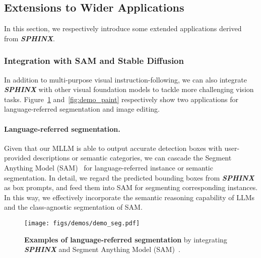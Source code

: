 \documentclass{article} \usepackage{iclr2024_conference,times}
\begin{document}
\subsection{Extensions to Wider Applications}
\label{s3.3}
In this section, we respectively introduce some extended applications derived from \textcolor{Goldenrod3}{\textbf{\textit{SPHINX}}}.

\subsubsection{Integration with SAM and Stable Diffusion}

In addition to multi-purpose visual instruction-following, we can also integrate \textcolor{Goldenrod3}{\textbf{\textit{SPHINX}}} with other visual foundation models to tackle more challenging vision tasks. Figure~\ref{fig:demo_seg} and~\ref{fig:demo_paint} respectively show two applications for language-referred segmentation and image editing. 

\paragraph{Language-referred segmentation.}
Given that our MLLM is able to output accurate detection boxes with user-provided descriptions or semantic categories, we can cascade the Segment Anything Model (SAM)~\citep{kirillov2023segment} for language-referred instance or semantic segmentation. In detail, we regard the predicted bounding boxes from \textcolor{Goldenrod3}{\textbf{\textit{SPHINX}}} as box prompts, and feed them into SAM for segmenting corresponding instances. In this way, we effectively incorporate the semantic reasoning capability of LLMs and the class-agnostic segmentation of SAM. 

\begin{figure}[t]
    \centering
\texttt{[image: figs/demos/demo\_seg.pdf]}
    \caption{\textbf{Examples of language-referred segmentation} by integrating \textcolor{Goldenrod3}{\textbf{\textit{SPHINX}}} and Segment Anything Model (SAM)~\citep{kirillov2023segment}.
    }
    \label{fig:demo_seg}
\end{figure}
\end{document}
